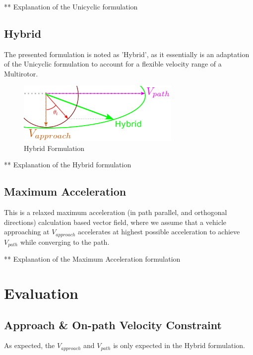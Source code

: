 \documentclass[10pt,twoside,a4paper]{report}
\begin{document}
** Explanation of the Unicyclic formulation

\section{Hybrid}

The presented formulation is noted as 'Hybrid', as it essentially is an adaptation of the Unicyclic formulation to account for a flexible velocity range  of a Multirotor.

\begin{figure}[h]
\centering
\includegraphics[width=0.7\textwidth]{Hybrid_Formulation}
\caption{Hybrid Formulation}
\end{figure}

** Explanation of the Hybrid formulation

\section{Maximum Acceleration}

This is a relaxed maximum acceleration (in path parallel, and orthogonal directions) calculation based vector field, where we assume that a vehicle approaching at $V_{approach}$ accelerates at highest possible acceleration to achieve $V_{path}$ while converging to the path.


** Explanation of the Maximum Acceleration formulation

\cleardoublepage

\chapter{Evaluation}

\section{Approach \& On-path Velocity Constraint}

As expected, the $V_{approach}$ and $V_{path}$ is only expected in the Hybrid formulation.
\end{document}
